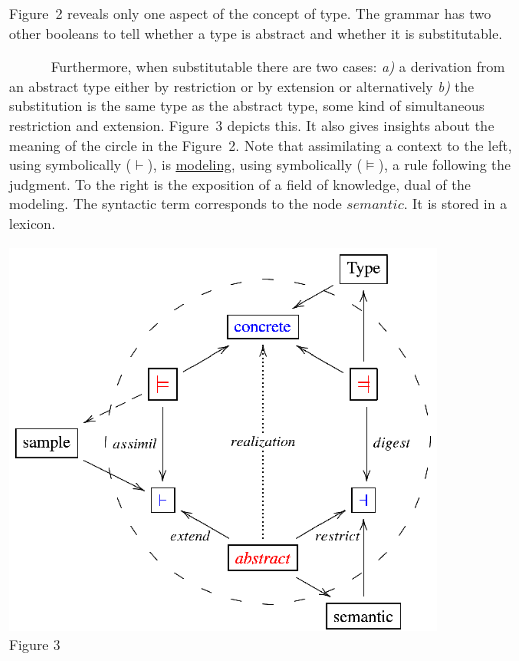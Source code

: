 Figure~2 reveals only one aspect of the concept of type. The grammar has two other booleans to tell whether a type is abstract and whether it is substitutable.\\ 
\noindent
\begin{minipage}[h]{7.0cm}
\indent
~~~~~~Furthermore, when substitutable there are two cases: {\it a)} a derivation from an abstract type either by restriction or by extension or alternatively {\it b)} the substitution is the same type as the abstract type, some kind of simultaneous restriction and extension. Figure~3 depicts this. It also gives insights about the meaning of the circle in the Figure~2. Note that assimilating a context to the left, using symbolically ($\vdash$), is \underline{modeling}, using symbolically ($\models$), a rule following the judgment. To the right is the exposition of a field of knowledge, dual of the modeling. The syntactic term corresponds to the node $semantic$. It is stored in a lexicon.

\end{minipage}
\begin{minipage}[h]{7.0cm}
 \begin{center}

  \includegraphics[width=0.85\textwidth]{part8/Viallefond_P52/P52_3.eps}
\\ Figure 3

 \end{center}
\end{minipage}
\hfill

